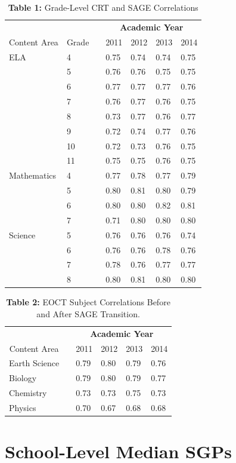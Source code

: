 \documentclass[12pt]{article}
\begin{document}
\begin{table}[H]
\caption*{\textbf{Table 1:} Grade-Level CRT and SAGE Correlations\label{table1}} 
\begin{center}
\begin{tabular}{llcllll}
\hline\hline
\multicolumn{2}{c}{\bfseries }&\multicolumn{1}{c}{\bfseries }&\multicolumn{4}{c}{\bfseries Academic Year}\tabularnewline
\cline{1-7}
\multicolumn{1}{c}{Content Area}&\multicolumn{1}{c}{Grade}&\multicolumn{1}{c}{}&\multicolumn{1}{c}{2011}&\multicolumn{1}{c}{2012}&\multicolumn{1}{c}{2013}&\multicolumn{1}{c}{2014}\tabularnewline
\hline
ELA& 4&&0.75&0.74&0.74&0.75\tabularnewline
& 5&&0.76&0.76&0.75&0.75\tabularnewline
& 6&&0.77&0.77&0.77&0.76\tabularnewline
& 7&&0.76&0.77&0.76&0.75\tabularnewline
& 8&&0.73&0.77&0.76&0.77\tabularnewline
& 9&&0.72&0.74&0.77&0.76\tabularnewline
&10&&0.72&0.73&0.76&0.75\tabularnewline
&11&&0.75&0.75&0.76&0.75\tabularnewline
Mathematics& 4&&0.77&0.78&0.77&0.79\tabularnewline
& 5&&0.80&0.81&0.80&0.79\tabularnewline
& 6&&0.80&0.80&0.82&0.81\tabularnewline
& 7&&0.71&0.80&0.80&0.80\tabularnewline
Science& 5&&0.76&0.76&0.76&0.74\tabularnewline
& 6&&0.76&0.76&0.78&0.76\tabularnewline
& 7&&0.78&0.76&0.77&0.77\tabularnewline
& 8&&0.80&0.81&0.80&0.80\tabularnewline
\hline
\end{tabular}\end{center}

\end{table}

\begin{table}[H]
\caption*{\textbf{Table 2:} EOCT Subject Correlations Before and After SAGE Transition.\label{table2}} 
\begin{center}
\begin{tabular}{lcllll}
\hline\hline
\multicolumn{1}{c}{\bfseries }&\multicolumn{1}{c}{\bfseries }&\multicolumn{4}{c}{\bfseries Academic Year}\tabularnewline
\cline{1-6}
\multicolumn{1}{c}{Content Area}&\multicolumn{1}{c}{}&\multicolumn{1}{c}{2011}&\multicolumn{1}{c}{2012}&\multicolumn{1}{c}{2013}&\multicolumn{1}{c}{2014}\tabularnewline
\hline
Earth Science&&0.79&0.80&0.79&0.76\tabularnewline
Biology&&0.79&0.80&0.79&0.77\tabularnewline
Chemistry&&0.73&0.73&0.75&0.73\tabularnewline
Physics&&0.70&0.67&0.68&0.68\tabularnewline
\hline
\end{tabular}\end{center}

\end{table}

\section{School-Level Median SGPs}\label{school-level-median-sgps}
\end{document}
